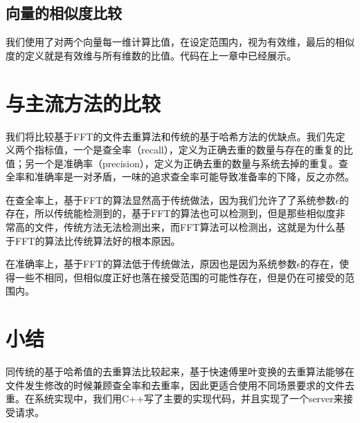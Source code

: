 \subsection{向量的相似度比较}

我们使用了对两个向量每一维计算比值，在设定范围内，视为有效维，最后的相似度的定义就是有效维与所有维数的比值。代码在上一章中已经展示。

\section{与主流方法的比较}

我们将比较基于FFT的文件去重算法和传统的基于哈希方法的优缺点。我们先定义两个指标值，一个是查全率（recall），定义为正确去重的数量与存在的重复的比值；另一个是准确率（precision），定义为正确去重的数量与系统去掉的重复。查全率和准确率是一对矛盾，一味的追求查全率可能导致准备率的下降，反之亦然。

在查全率上，基于FFT的算法显然高于传统做法，因为我们允许了了系统参数$\epsilon$的存在，所以传统能检测到的，基于FFT的算法也可以检测到，但是那些相似度非常高的文件，传统方法无法检测出来，而FFT算法可以检测出，这就是为什么基于FFT的算法比传统算法好的根本原因。

在准确率上，基于FFT的算法低于传统做法，原因也是因为系统参数$\epsilon$的存在，使得一些不相同，但相似度正好也落在接受范围的可能性存在，但是仍在可接受的范围内。

\section{小结}
\label{sec:cons}

同传统的基于哈希值的去重算法比较起来，基于快速傅里叶变换的去重算法能够在文件发生修改的时候兼顾查全率和去重率，因此更适合使用不同场景要求的文件去重。在系统实现中，我们用C++写了主要的实现代码，并且实现了一个server来接受请求。

